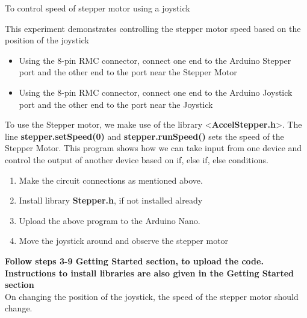 \documentclass[../manual.tex]{subfiles}
\begin{document}


\expaim
To control speed of stepper motor using a joystick

\expdesc
This experiment demonstrates controlling the stepper motor speed based on the position of the joystick

\expcircuitconnection
\begin{itemize}
	\item Using the 8-pin RMC connector, connect one end to the Arduino Stepper port and the other end to the port near the Stepper Motor
	\item Using the 8-pin RMC connector, connect one end to the Arduino Joystick port and the other end to the port near the Joystick
\end{itemize}

\expprogram



\expexplanation
To use the Stepper motor, we make use of the library \textless \textbf{AccelStepper.h}\textgreater. The line \textbf{stepper.setSpeed(0)} and \textbf{stepper.runSpeed()} sets the speed of the Stepper Motor.
This program shows how we can take input from one device and control the output of another device based on if, else if, else conditions.

\expprocedure

\begin{enumerate}
	\item Make the circuit connections as mentioned above.
	\item Install library \textbf{Stepper.h}, if not installed already
	\item Upload the above program to the Arduino Nano.
	\item Move the joystick around and observe the stepper motor
\end{enumerate}

\textbf{Follow steps 3-9 Getting Started section, to upload the code.
	Instructions to install libraries are also given in the Getting Started section} \\

\expresult
On changing the position of the joystick, the speed of the stepper motor should change.
\end{document}

